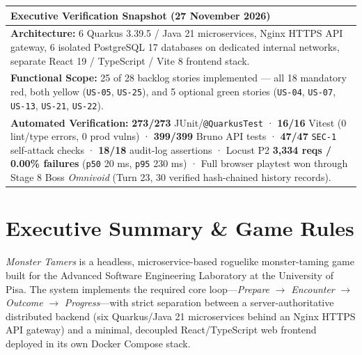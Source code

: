 \documentclass[10.5pt,a4paper]{article}
\DeclareRobustCommand{\code}[1]{\begingroup\def\_{\textunderscore\allowbreak}\texttt{#1}\endgroup}
\newenvironment{callout}[1]{%
  \par\medskip\noindent
  \begin{tabular}{|p{\dimexpr\linewidth-2\tabcolsep-2\arrayrulewidth\relax}|}
  \hline
  \rowcolor{accentlight}\sffamily\bfseries\small\color{accent} #1 \\
  \hline
  \vspace{0.15em}\small
}{%
  \vspace{0.15em}\\
  \hline
  \end{tabular}\par\medskip
}
\begin{document}
\begin{titlepage}
  \vfill
  \begin{callout}{Executive Verification Snapshot (27 November 2026)}
    \textbf{Architecture:} 6 Quarkus 3.39.5 / Java 21 microservices, Nginx HTTPS API gateway, 6 isolated PostgreSQL 17 databases on dedicated internal networks, separate React 19 / TypeScript / Vite 8 frontend stack.\\
    \textbf{Functional Scope:} 25 of 28 backlog stories implemented — all 18 mandatory red, both yellow (\code{US-05}, \code{US-25}), and 5 optional green stories (\code{US-04}, \code{US-07}, \code{US-13}, \code{US-21}, \code{US-22}).\\
    \textbf{Automated Verification:} \textbf{273/273} JUnit/\code{@QuarkusTest} · \textbf{16/16} Vitest (0 lint/type errors, 0 prod vulns) · \textbf{399/399} Bruno API tests · \textbf{47/47} \code{SEC-1} self-attack checks · \textbf{18/18} audit-log assertions · Locust P2 \textbf{3,334 reqs / 0.00\% failures} (\code{p50} 20 ms, \code{p95} 230 ms) · Full browser playtest won through Stage 8 Boss \emph{Omnivoid} (Turn 23, 30 verified hash-chained history records).
  \end{callout}
  \vspace{0.3cm}
\end{titlepage}
\hypersetup{pageanchor=true}

\setcounter{tocdepth}{2}
\tableofcontents
\clearpage

\section{Executive Summary \& Game Rules}
\label{sec:exec-summary}

\emph{Monster Tamers} is a headless, microservice-based roguelike monster-taming game built for the Advanced Software Engineering Laboratory at the University of Pisa. The system implements the required core loop—\emph{Prepare} $\rightarrow$ \emph{Encounter} $\rightarrow$ \emph{Outcome} $\rightarrow$ \emph{Progress}—with strict separation between a server-authoritative distributed backend (six Quarkus/Java 21 microservices behind an Nginx HTTPS API gateway) and a minimal, decoupled React/TypeScript web frontend deployed in its own Docker Compose stack.
\end{document}
